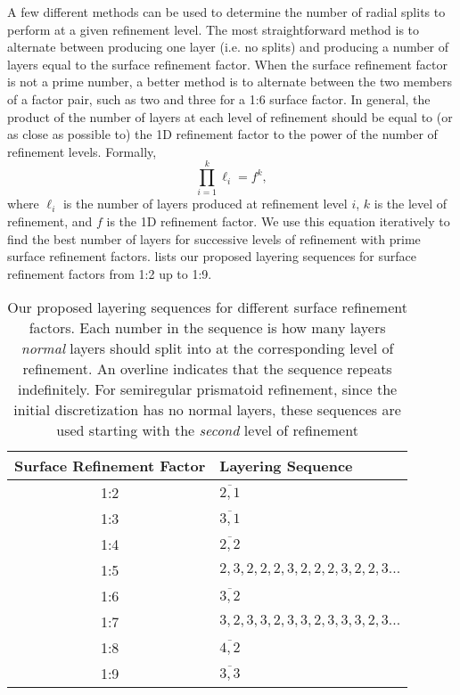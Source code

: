 A few different methods can be used to determine the number of radial splits to perform at a given refinement level.
The most straightforward method is to alternate between producing one layer (i.e.
no splits) and producing a number of layers equal to the surface refinement factor.
When the surface refinement factor is not a prime number, a better method is to alternate between the two members of a factor pair, such as two and three for a 1:6 surface factor.
In general, the product of the number of layers at each level of refinement should be equal to (or as close as possible to) the 1D refinement factor to the power of the number of refinement levels.
Formally,
%
\begin{equation*}
\prod_{i = 1}^{k} \ell_{i} = f^{k},
\end{equation*}
%
where $\ell_{i}$ is the number of layers produced at refinement level $i$, $k$ is the level of refinement, and $f$ is the 1D refinement factor.
We use this equation iteratively to find the best number of layers for successive levels of refinement with prime surface refinement factors.
 lists our proposed layering sequences for surface refinement factors from 1:2 up to 1:9.


\begin{table}[ht!]
	\centering
	\caption[Layering sequences for different surface refinement factors]{
		Our proposed layering sequences for different surface refinement factors.
		Each number in the sequence is how many layers \textit{normal} layers should split into at the corresponding level of refinement.
		An overline indicates that the sequence repeats indefinitely.
		For semiregular prismatoid refinement, since the initial discretization has no normal layers, these sequences are used starting with the \textit{second} level of refinement
	}
	\begin{tabular}{@{} c l @{}}
		\toprule
		Surface Refinement Factor & Layering Sequence         \\ \midrule
		1:2                  & $\overline{2,1}$               \\
		1:3                  & $\overline{3,1}$               \\
		1:4                  & $\overline{2,2}$               \\
		1:5                  & $2,3,2,2,2,3,2,2,2,3,2,2,3...$ \\
		1:6                  & $\overline{3,2}$               \\
		1:7                  & $3,2,3,3,2,3,3,2,3,3,3,2,3...$ \\
		1:8                  & $\overline{4,2}$               \\
		1:9                  & $\overline{3,3}$               \\ \bottomrule
	\end{tabular}
	\label{tab:layers}
\end{table}


